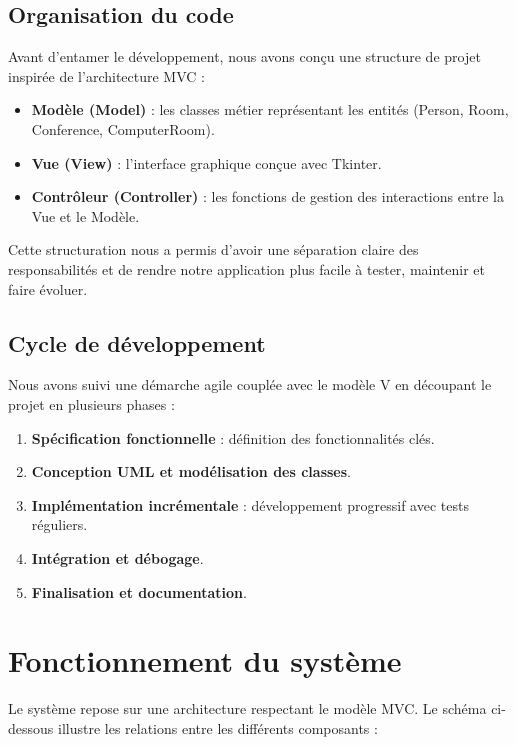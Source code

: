 \documentclass[a4paper,12pt]{article}
\begin{document}
\subsection*{Organisation du code}
Avant d'entamer le développement, nous avons conçu une structure de projet inspirée de l'architecture MVC :
\begin{itemize}
    \item \textbf{Modèle (Model)} : les classes métier représentant les entités (Person, Room, Conference, ComputerRoom).
    \item \textbf{Vue (View)} : l’interface graphique conçue avec Tkinter.
    \item \textbf{Contrôleur (Controller)} : les fonctions de gestion des interactions entre la Vue et le Modèle.
\end{itemize}

Cette structuration nous a permis d’avoir une séparation claire des responsabilités et de rendre notre application plus facile à tester, maintenir et faire évoluer.

\subsection*{Cycle de développement}
Nous avons suivi une démarche agile couplée avec le modèle V en découpant le projet en plusieurs phases :
\begin{enumerate}
    \item \textbf{Spécification fonctionnelle} : définition des fonctionnalités clés.
    \item \textbf{Conception UML et modélisation des classes}.
    \item \textbf{Implémentation incrémentale} : développement progressif avec tests réguliers.
    \item \textbf{Intégration et débogage}.
    \item \textbf{Finalisation et documentation}.
\end{enumerate}

\newpage
\section{Fonctionnement du syst\`eme} \label{fonction_sys}

Le syst\`eme repose sur une architecture respectant le mod\`ele MVC. Le sch\'ema ci-dessous illustre les relations entre les diff\'erents composants :
\end{document}
